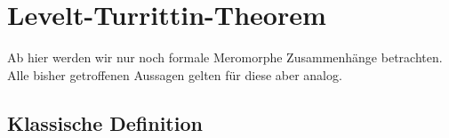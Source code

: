 \chapter{Levelt-\!Turrittin-\!Theorem}
\begin{comment}
  Quellen:\\
  sabbah\_cimpa90 seite 28 / 30
\end{comment}

Ab hier werden wir nur noch formale Meromorphe Zusammenhänge betrachten. Alle
bisher getroffenen Aussagen gelten für diese aber analog.

\begin{comment}
  Sei $M_{\hat{K}}=\cD_{\hat{K}}/\cD_{\hat{K}}\cdot P$ und nehme an, dass $N(P)$
  zumindes 2 nichttriviale Steigungen hat. Spalte $N(P)=N_1\dot\cup N_2$ in 2
  Teile. Dann gilt:

  \begin{lem}
    Es existiert eine Aufteilung $P=P_1P_2$ mit:
    \begin{itemize}
      \item $N(P_1)\subset N_1$ und $N(P_2)\subset N_2$
      \item A ist eine kante von ...
    \end{itemize}
  \end{lem}
\end{comment}

\section{Klassische Definition}

